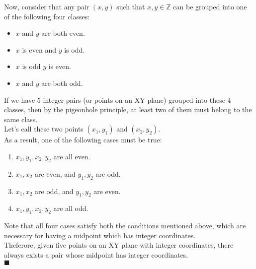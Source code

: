 \documentclass[a4paper,12pt]{article} %
\begin{document}
\begin{enumerate}
	Now, consider that any pair $(x, y)$ such that $x, y \in \mathbb{Z}$ can be grouped into one of the following four classes:

	\begin{itemize}
		\item $x$ and $y$ are both even.
		\item $x$ is even and $y$ is odd.
		\item $x$ is odd $y$ is even.
		\item $x$ and $y$ are both odd.
	\end{itemize}

	If we have 5 integer pairs (or points on an XY plane) grouped into these 4 classes, then by the pigeonhole principle, at least two of them must belong to the same class.\\
	Let's call these two points $(x_1, y_1)$ and $(x_2, y_2)$.\\
	As a result, one of the following cases must be true:

	\begin{enumerate}
		\item $x_1, y_1, x_2, y_2$ are all even.
		\item $x_1, x_2$ are even, and $y_1, y_2$ are odd.
		\item $x_1, x_2$ are odd, and $y_1, y_2$ are even.
		\item $x_1, y_1, x_2, y_2$ are all odd.
	\end{enumerate}
	Note that all four cases satisfy both the conditions mentioned above, which are necessary for having a midpoint which has integer coordinates.\\
	Theferore, given five points on an XY plane with integer coordinates, there always exists a pair whose midpoint has integer coordinates.\\
	$\blacksquare$


\end{enumerate}
\end{document}
